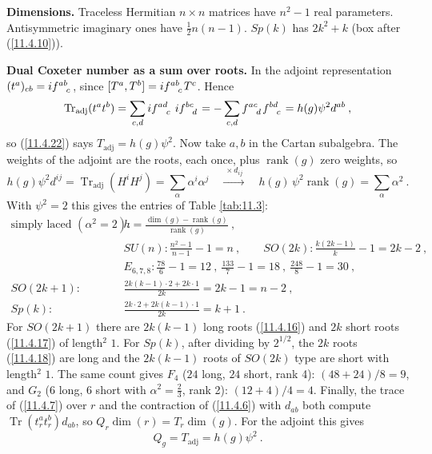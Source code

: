 \begin{tcolorbox}[breakable]
	\begin{remark}
		\textbf{Dimensions.} Traceless Hermitian $n\times n$ matrices have $n^{2}-1$ real parameters. Antisymmetric imaginary ones have $\frac{1}{2}n(n-1)$. $Sp(k)$ has $2k^{2}+k$ (box after (\ref{11.4.10})).

		\textbf{Dual Coxeter number as a sum over roots.} In the adjoint representation $(t^{a})_{cb}=\mi f\indices{^a^b_c}$, since $[T^{a},T^{b}]=\mi f\indices{^a^b_c}T^{c}$. Hence
		\begin{equation*}
			\operatorname{Tr}_{\text{adj}}(t^{a}t^{b})=\sum_{c,d}\mi f\indices{^a^d_c}\;\mi f\indices{^b^c_d}=-\sum_{c,d}f\indices{^a^c_d}f\indices{^b^d_c}=h(g)\psi^{2}d^{ab}\:,
		\end{equation*}
		so (\ref{11.4.22}) says $T_{\text{adj}}=h(g)\psi^{2}$. Now take $a,b$ in the Cartan subalgebra. The weights of the adjoint are the roots, each once, plus $\operatorname{rank}(g)$ zero weights, so
		\begin{equation*}
			h(g)\psi^{2}d^{ij}=\operatorname{Tr}_{\text{adj}}(H^{i}H^{j})=\sum_{\alpha}\alpha^{i}\alpha^{j}
			\quad\xrightarrow{\ \times d_{ij}\ }\quad
			h(g)\,\psi^{2}\operatorname{rank}(g)=\sum_{\alpha}\alpha^{2}\:.
		\end{equation*}
		With $\psi^{2}=2$ this gives the entries of Table \ref{tab:11.3}:
		\begin{align*}
			\text{simply laced }(\alpha^{2}=2):&\quad h=\frac{\operatorname{dim}(g)-\operatorname{rank}(g)}{\operatorname{rank}(g)}\:,\\
			&\quad SU(n): \tfrac{n^{2}-1}{n-1}-1=n\:,\qquad SO(2k): \tfrac{k(2k-1)}{k}-1=2k-2\:,\\
			&\quad E_{6,7,8}: \tfrac{78}{6}-1=12\:,\ \tfrac{133}{7}-1=18\:,\ \tfrac{248}{8}-1=30\:,\\
			SO(2k+1):&\quad \frac{2k(k-1)\cdot2+2k\cdot1}{2k}=2k-1=n-2\:,\\
			Sp(k):&\quad \frac{2k\cdot2+2k(k-1)\cdot1}{2k}=k+1\:.
		\end{align*}
		For $SO(2k+1)$ there are $2k(k-1)$ long roots (\ref{11.4.16}) and $2k$ short roots (\ref{11.4.17}) of length$^{2}$ $1$. For $Sp(k)$, after dividing by $2^{1/2}$, the $2k$ roots (\ref{11.4.18}) are long and the $2k(k-1)$ roots of $SO(2k)$ type are short with length$^{2}$ $1$. The same count gives $F_{4}$ ($24$ long, $24$ short, rank 4): $(48+24)/8=9$, and $G_{2}$ ($6$ long, $6$ short with $\alpha^{2}=\frac{2}{3}$, rank 2): $(12+4)/4=4$. Finally, the trace of (\ref{11.4.7}) over $r$ and the contraction of (\ref{11.4.6}) with $d_{ab}$ both compute $\operatorname{Tr}(t^{a}_{r}t^{b}_{r})d_{ab}$, so $Q_{r}\operatorname{dim}(r)=T_{r}\operatorname{dim}(g)$. For the adjoint this gives
		\begin{equation*}
			Q_{g}=T_{\text{adj}}=h(g)\psi^{2}\:.
		\end{equation*}
	\end{remark}
\end{tcolorbox}

